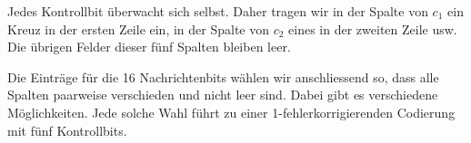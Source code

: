 \begin{center}
\end{center}

Jedes Kontrollbit überwacht sich selbst. Daher tragen wir
in der Spalte von \(c_1\) ein Kreuz in der ersten Zeile ein,
in der Spalte von \(c_2\) eines in der zweiten Zeile usw.
Die übrigen Felder dieser fünf Spalten bleiben leer.

Die Einträge für die 16 Nachrichtenbits wählen wir
anschliessend so, dass alle Spalten paarweise verschieden
und nicht leer sind. Dabei gibt es verschiedene Möglichkeiten.
Jede solche Wahl führt zu einer 1-fehlerkorrigierenden
Codierung mit fünf Kontrollbits.


